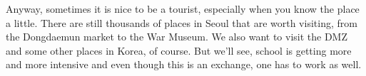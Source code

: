 \begin{post}
\begin{content}
Anyway, sometimes it is nice to be a tourist, especially when you know the place a little. There are still thousands of places in Seoul that are worth visiting, from the Dongdaemun market to the War Museum. We also want to visit the DMZ and some other places in Korea, of course. But we'll see, school is getting more and more intensive and even though this is an exchange, one has to work as well.

	\end{content}
\end{post}

